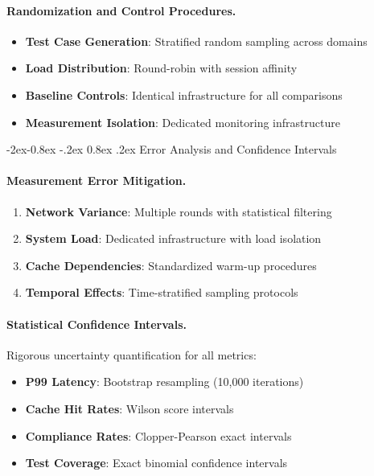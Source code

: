 \documentclass[manuscript,screen,9pt]{acmart}
\makeatletter
\renewcommand\subsubsection{\@startsection{subsubsection}{3}{\z@}%
  {-2ex\@plus -0.8ex \@minus -.2ex}%
  {0.8ex \@plus .2ex}%
  {\normalfont\normalsize\bfseries}}
\makeatother
\begin{document}
\paragraph{Randomization and Control Procedures.}
\begin{itemize}[leftmargin=*,itemsep=1pt,parsep=1pt]
	\item \textbf{Test Case Generation}: Stratified random sampling across domains
	\item \textbf{Load Distribution}: Round-robin with session affinity
	\item \textbf{Baseline Controls}: Identical infrastructure for all comparisons
	\item \textbf{Measurement Isolation}: Dedicated monitoring infrastructure
\end{itemize}

\subsubsection{Error Analysis and Confidence Intervals}
\label{subsubsec:error_analysis}

\paragraph{Measurement Error Mitigation.}
\begin{enumerate}[leftmargin=*,itemsep=1pt,parsep=1pt]
	\item \textbf{Network Variance}: Multiple rounds with statistical filtering
	\item \textbf{System Load}: Dedicated infrastructure with load isolation
	\item \textbf{Cache Dependencies}: Standardized warm-up procedures
	\item \textbf{Temporal Effects}: Time-stratified sampling protocols
\end{enumerate}

\paragraph{Statistical Confidence Intervals.}
Rigorous uncertainty quantification for all metrics:
\begin{itemize}[leftmargin=*,itemsep=1pt,parsep=1pt]
	\item \textbf{P99 Latency}: Bootstrap resampling (10,000 iterations)
	\item \textbf{Cache Hit Rates}: Wilson score intervals
	\item \textbf{Compliance Rates}: Clopper-Pearson exact intervals
	\item \textbf{Test Coverage}: Exact binomial confidence intervals
\end{itemize}
\end{document}
